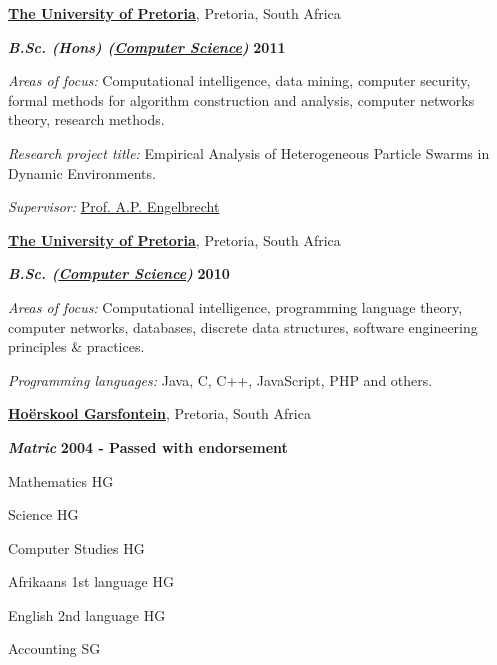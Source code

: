 \documentclass[10pt]{article}
\newenvironment{outerlist}[1][\enskip\textbullet]%
        {\begin{itemize}[#1]}{\end{itemize}%
         \vspace{-.6\baselineskip}}
\newenvironment{innerlist}[1][\enskip\textbullet]%
        {\begin{compactitem}[#1]}{\end{compactitem}}
\begin{document}
\href{http://www.up.ac.za/}{\textbf{The University of Pretoria}},
Pretoria, South Africa
\begin{outerlist}
\item[] \textbf{\textit{B.Sc. (Hons) (\href{http://www.cs.up.ac.za/}{Computer Science})}} \hfill \textbf{2011}
        \begin{innerlist}
        \item \emph{Areas of focus:} Computational intelligence, data mining, computer security, formal methods for algorithm construction and analysis, computer networks theory, research methods.
        \item \emph{Research project title:} Empirical Analysis of Heterogeneous Particle Swarms in Dynamic Environments.
        \item \emph{Supervisor:} \href{http://www.cs.up.ac.za/engel/}{Prof. A.P. Engelbrecht}\\
        \end{innerlist}
\end{outerlist}

\href{http://www.up.ac.za/}{\textbf{The University of Pretoria}},
Pretoria, South Africa
\begin{outerlist}
\item[] \textbf{\textit{B.Sc. (\href{http://www.cs.up.ac.za/}{Computer Science})}} \hfill \textbf{2010}
        \begin{innerlist}
        \item \emph{Areas of focus:} Computational intelligence, programming language theory, computer networks, databases, discrete data structures, software engineering principles \& practices.
        \item \emph{Programming languages:} Java, C, C++, JavaScript, PHP and others.\\
        \end{innerlist}
\end{outerlist}

\href{}{\textbf{Ho\"erskool Garsfontein}}, Pretoria, South Africa
\begin{outerlist}
\item[] \textbf{\textit{Matric}} \hfill \textbf{2004 - Passed with endorsement}
        \begin{innerlist}
        \item Mathematics HG
        \item Science HG
        \item Computer Studies HG
        \item Afrikaans 1st language HG
        \item English 2nd language HG
        \item Accounting SG
        \end{innerlist}
\end{outerlist}
\pagebreak
\end{document}
